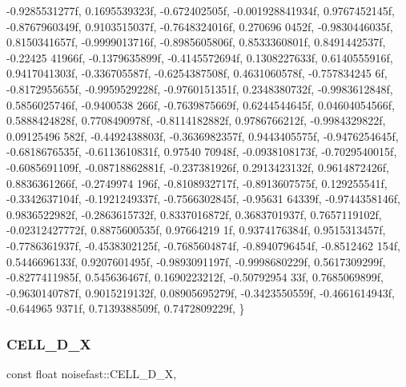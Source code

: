 \begin{DoxyCode}
      -0.9285531277f, 0.1695539323f,
    -0.672402505f, -0.001928841934f, 0.9767452145f, -0.8767960349f, 0.9103515037f, -0.7648324016f, 0.270696
      0452f, -0.9830446035f, 0.8150341657f, -0.9999013716f, -0.8985605806f, 0.8533360801f, 0.8491442537f, -0.22425
      41966f, -0.1379635899f, -0.4145572694f,
    0.1308227633f, 0.6140555916f, 0.9417041303f, -0.336705587f, -0.6254387508f, 0.4631060578f, -0.757834245
      6f, -0.8172955655f, -0.9959529228f, -0.9760151351f, 0.2348380732f, -0.9983612848f, 0.5856025746f, -0.9400538
      266f, -0.7639875669f, 0.6244544645f,
    0.04604054566f, 0.5888424828f, 0.7708490978f, -0.8114182882f, 0.9786766212f, -0.9984329822f, 0.09125496
      582f, -0.4492438803f, -0.3636982357f, 0.9443405575f, -0.9476254645f, -0.6818676535f, -0.6113610831f, 0.97540
      70948f, -0.0938108173f, -0.7029540015f,
    -0.6085691109f, -0.08718862881f, -0.237381926f, 0.2913423132f, 0.9614872426f, 0.8836361266f, -0.2749974
      196f, -0.8108932717f, -0.8913607575f, 0.129255541f, -0.3342637104f, -0.1921249337f, -0.7566302845f, -0.95631
      64339f, -0.9744358146f, 0.9836522982f,
    -0.2863615732f, 0.8337016872f, 0.3683701937f, 0.7657119102f, -0.02312427772f, 0.8875600535f, 0.97664219
      1f, 0.9374176384f, 0.9515313457f, -0.7786361937f, -0.4538302125f, -0.7685604874f, -0.8940796454f, -0.8512462
      154f, 0.5446696133f, 0.9207601495f,
    -0.9893091197f, -0.9998680229f, 0.5617309299f, -0.8277411985f, 0.545636467f, 0.1690223212f, -0.50792954
      33f, 0.7685069899f, -0.9630140787f, 0.9015219132f, 0.08905695279f, -0.3423550559f, -0.4661614943f, -0.644965
      9371f, 0.7139388509f, 0.7472809229f,
\}
\end{DoxyCode}
\mbox{\label{classnoisefast_ab8cfc5462b1a5ef8a5508517a0223307}} 
\subsubsection{\texorpdfstring{C\+E\+L\+L\+\_\+D\+\_\+X}{CELL\_3D\_X}}
{\footnotesize\ttfamily const float noisefast\+::\+C\+E\+L\+L\+\_\+D\+\_\+X\hspace{0.3cm}{\ttfamily [static]}, {\ttfamily [private]}}

